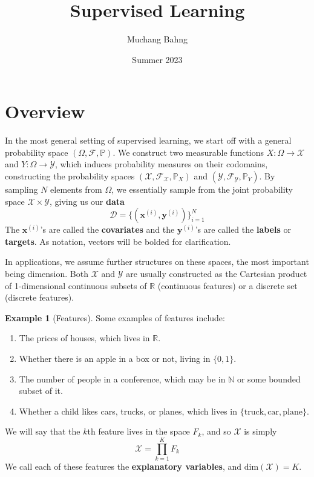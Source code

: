 \documentclass{article}
\theoremstyle{definition}
\newtheorem{example}{Example}[section]
\theoremstyle{remark}
\theoremstyle{definition}
\begin{document}
\pagestyle{fancy}

\cfoot{\thepage / \pageref{LastPage}}

\title{Supervised Learning}
\author{Muchang Bahng}
\date{Summer 2023}

\maketitle

\tableofcontents

\pagebreak 

\section{Overview}

In the most general setting of supervised learning, we start off with a general probability space $(\Omega, \mathcal{F}, \mathbb{P})$. We construct two measurable functions $X: \Omega \rightarrow \mathcal{X}$ and $Y: \Omega \rightarrow \mathcal{Y}$, which induces probability measures on their codomains, constructing the probability spaces $(\mathcal{X}, \mathcal{F}_{\mathcal{X}}, \mathbb{P}_X)$ and $(\mathcal{Y}, \mathcal{F}_{\mathcal{Y}}, \mathbb{P}_Y)$. By sampling $N$ elements from $\Omega$, we essentially sample from the joint probability space $\mathcal{X} \times \mathcal{Y}$, giving us our \textbf{data} 
\[\mathcal{D} = \{(\mathbf{x}^{(i)}, \mathbf{y}^{(i)}) \}_{i=1}^N\]
The $\mathbf{x}^{(i)}$'s are called the \textbf{covariates} and the $\mathbf{y}^{(i)}$'s are called the \textbf{labels} or \textbf{targets}. As notation, vectors will be bolded for clarification. 

In applications, we assume further structures on these spaces, the most important being dimension. Both $\mathcal{X}$ and $\mathcal{Y}$ are usually constructed as the Cartesian product of 1-dimensional continuous subsets of $\mathbb{R}$ (continuous features) or a discrete set (discrete features). 

\begin{example}[Features]
Some examples of features include: 
\begin{enumerate}
    \item The prices of houses, which lives in $\mathbb{R}$. 
    \item Whether there is an apple in a box or not, living in $\{0, 1\}$. 
    \item The number of people in a conference, which may be in $\mathbb{N}$ or some bounded subset of it. 
    \item Whether a child likes cars, trucks, or planes, which lives in $\{\text{truck}, \text{car}, \text{plane}\}$. 
\end{enumerate}
\end{example}
We will say that the $k$th feature lives in the space $F_k$, and so $\mathcal{X}$ is simply 
\[\mathcal{X} = \prod_{k=1}^K  F_k\]
We call each of these features the \textbf{explanatory variables}, and $\mathrm{dim}(\mathcal{X}) = K$. 
\end{document}
